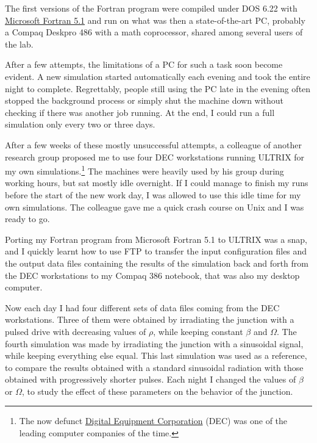 The first versions of the Fortran program were compiled under DOS 6.22 with \href{https://winworldpc.com/product/microsoft-fortran/5x}{Microsoft Fortran 5.1} and run on what was then a state-of-the-art PC, probably a Compaq Deskpro 486 with a math coprocessor, shared among several users of the lab.

After a few attempts, the limitations of a PC for such a task soon become evident.
A new simulation started automatically each evening and took the entire night to complete. Regrettably, people still using the PC late in the evening often stopped the background process or simply shut the machine down without checking if there was another job running. 
At the end, I could run a full simulation only every two or three days.

After a few weeks of these mostly unsuccessful attempts, a colleague of another research group proposed me to use four DEC workstations running ULTRIX for my own simulations.\footnote{The now defunct \href{https://en.wikipedia.org/wiki/Digital_Equipment_Corporation}{Digital Equipment Corporation} (DEC) was one of the leading computer companies of the time.}
The machines were heavily used by his group during working hours, but sat mostly idle overnight. 
If I could manage to finish my runs before the start of the new work day, I was allowed to use this idle time for my own simulations.
The colleague gave me a quick crash course on Unix and I was ready to go.

Porting my Fortran program from Microsoft Fortran 5.1 to ULTRIX was a snap, and I quickly learnt how to use FTP to transfer the input configuration files and the output data files containing the results of the simulation back and forth from the DEC workstations to my Compaq 386 notebook, that was also my desktop computer.

Now each day I had four different sets of data files coming from the DEC workstations. Three of them were obtained by irradiating the junction with a pulsed drive with decreasing values of $\rho$, while keeping constant $\beta$ and $\Omega$.
The fourth simulation was made by irradiating the junction with a sinusoidal signal, while keeping everything else equal. This last simulation was used as a reference, to compare the results obtained with a standard sinusoidal radiation with those obtained with progressively shorter pulses.
Each night I changed the values of $\beta$ or $\Omega$, to study the effect of these parameters on the behavior of the junction.

